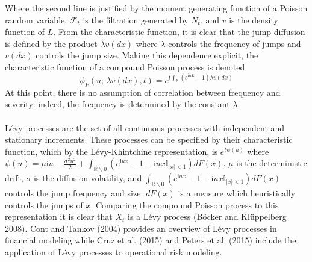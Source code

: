 \documentclass{article}
\theoremstyle{definition}
\begin{document}
Where the second line is justified by the moment generating function of a Poisson random variable, \(\mathcal{F}_t\) is the filtration generated by \(N_t\), and \(v\) is the density function of \(L\).  From the characteristic function, it is clear that the jump diffusion is defined by the product \(\lambda v(dx)\) where \(\lambda\) controls the frequency of jumps and \(v(dx)\) controls the jump size. Making this dependence explicit, the characteristic function of a compound Poisson process is denoted
\begin{equation}\phi_P (u;\,\lambda v(dx), t)=e^{t \int_{\mathbb{R}} (e^{\mathrm{i}uL}-1) \lambda v(dx)}\end{equation}
At this point, there is no assumption of correlation between frequency and severity: indeed, the frequency is determined by the constant \(\lambda\).  
\\
\\

L\'evy processes are the set of all continuous processes with independent and stationary increments.  These processes can be specified by their characteristic function, which by the L\'evy-Khintchine representation, is \(e^{t\psi(u)}\) where \(\psi(u)=\mu \mathrm{i} u -\frac{\sigma^2 u^2}{2}+\int_{\mathbb{R}\backslash 0} \left(e^{\mathrm{i} u x}-1-\mathrm{i}ux\mathbb{I}_{|x|<1}\right)dF(x)\). \(\mu\) is the deterministic drift, \(\sigma\) is the diffusion volatility, and \(\int_{\mathbb{R}\backslash 0} \left(e^{\mathrm{i} u x}-1-\mathrm{i}ux\mathbb{I}_{|x|<1}\right)dF(x)\) controls the jump frequency and size.  \(dF(x)\) is a measure which heuristically controls the jumps of \(x\).  Comparing the compound Poisson process to this representation it is clear that \(X_t\) is a L\'evy process (B\"ocker and Kl\"uppelberg 2008).  Cont and Tankov (2004) provides an overview of L\'evy processes in financial modeling while Cruz et al. (2015) and Peters et al. (2015) include the application of L\'evy processes to operational risk modeling.
\end{document}
